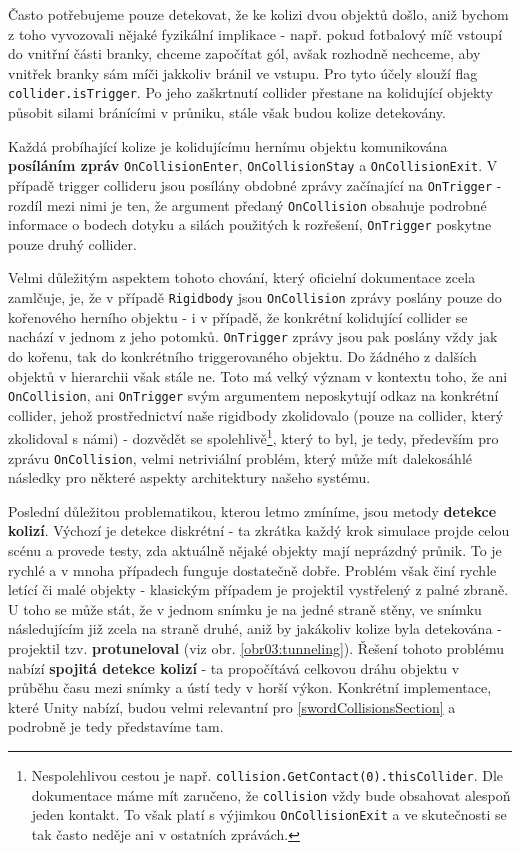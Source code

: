 Často potřebujeme pouze detekovat, že ke kolizi dvou objektů došlo, aniž bychom z toho vyvozovali nějaké fyzikální implikace - např. pokud fotbalový míč vstoupí do vnitřní části branky, chceme započítat gól, avšak rozhodně nechceme, aby vnitřek branky sám míči jakkoliv bránil ve vstupu. Pro tyto účely slouží flag \texttt{collider.isTrigger}. Po jeho zaškrtnutí collider přestane na kolidující objekty působit silami bránícími v průniku, stále však budou kolize detekovány.

Každá probíhající kolize je kolidujícímu hernímu objektu komunikována \textbf{posíláním zpráv} \texttt{OnCollisionEnter}, \texttt{OnCollisionStay} a \texttt{OnCollisionExit}. V případě trigger collideru jsou posílány obdobné zprávy začínající na \texttt{OnTrigger} - rozdíl mezi nimi je ten, že argument předaný \texttt{OnCollision} obsahuje podrobné informace o bodech dotyku a silách použitých k rozřešení, \texttt{OnTrigger} poskytne pouze druhý collider. 

Velmi důležitým aspektem tohoto chování, který oficielní dokumentace zcela zamlčuje, je, že v případě \texttt{Rigidbody} jsou \texttt{OnCollision} zprávy poslány pouze do kořenového herního objektu - i v případě, že konkrétní kolidující collider se nachází v jednom z jeho potomků. \texttt{OnTrigger} zprávy jsou pak poslány vždy jak do kořenu, tak do konkrétního triggerovaného objektu. Do žádného z dalších objektů v hierarchii však stále ne. Toto má velký význam v kontextu toho, že ani \texttt{OnCollision}, ani \texttt{OnTrigger} svým argumentem neposkytují odkaz na konkrétní collider, jehož prostřednictví naše rigidbody zkolidovalo (pouze na collider, který zkolidoval s námi) - dozvědět se spolehlivě\footnote{Nespolehlivou cestou je např. \texttt{collision.GetContact(0).thisCollider}. Dle dokumentace máme mít zaručeno, že \texttt{collision} vždy bude obsahovat alespoň jeden kontakt. To však platí s výjimkou \texttt{OnCollisionExit} a ve skutečnosti se tak často neděje ani v ostatních zprávách.}, který to byl, je tedy, především pro zprávu \texttt{OnCollision}, velmi netriviální problém, který může mít dalekosáhlé následky pro některé aspekty architektury našeho systému.

Poslední důležitou problematikou, kterou letmo zmíníme, jsou metody \textbf{detekce kolizí}. Výchozí je detekce diskrétní - ta zkrátka každý krok simulace projde celou scénu a provede testy, zda aktuálně nějaké objekty mají neprázdný průnik. To je rychlé a v mnoha případech funguje dostatečně dobře. Problém však činí rychle letící či malé objekty - klasickým případem je projektil vystřelený z palné zbraně. U toho se může stát, že v jednom snímku je na jedné straně stěny, ve snímku následujícím již zcela na straně druhé, aniž by jakákoliv kolize byla detekována - projektil tzv. \textbf{protuneloval} (viz obr. \ref{obr03:tunneling}). Řešení tohoto problému nabízí \textbf{spojitá detekce kolizí} - ta propočítává celkovou dráhu objektu v průběhu času mezi snímky a ústí tedy v horší výkon. Konkrétní implementace, které Unity nabízí, budou velmi relevantní pro \ref{swordCollisionsSection} a podrobně je tedy představíme tam.

